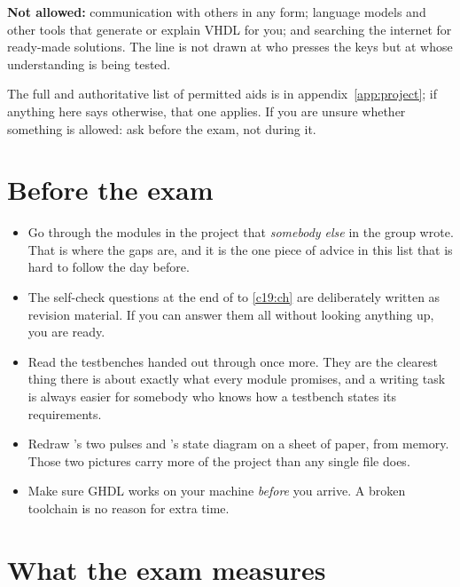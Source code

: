\textbf{Not allowed:} communication with others in any form; language models and other tools that
generate or explain VHDL for you; and searching the internet for ready-made solutions. The line is not
drawn at who presses the keys but at whose understanding is being tested.

The full and authoritative list of permitted aids is in appendix~\ref{app:project}; if anything here
says otherwise, that one applies. If you are unsure whether something is allowed: ask before the exam,
not during it.

\section{Before the exam}
\label{c20:sec:prep}

\begin{itemize}
  \item Go through the modules in the project that \emph{somebody else} in the group wrote. That is
    where the gaps are, and it is the one piece of advice in this list that is hard to follow the day
    before.
  \item The self-check questions at the end of  to \ref{c19:ch} are deliberately
    written as revision material. If you can answer them all without looking anything up, you are
    ready.
  \item Read the testbenches handed out through once more. They are the clearest thing there is about
    exactly what every module promises, and a writing task is always easier for somebody who knows how
    a testbench states its requirements.
  \item Redraw 's two pulses and 's state diagram on a sheet of
    paper, from memory. Those two pictures carry more of the project than any single file does.
  \item Make sure GHDL works on your machine \emph{before} you arrive. A broken toolchain is no reason
    for extra time.
\end{itemize}

\section{What the exam measures}
\label{c20:sec:measures}

